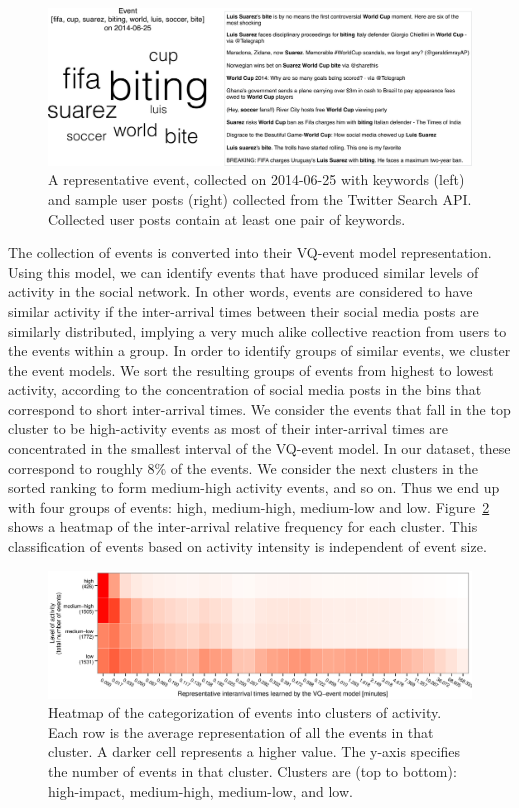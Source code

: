 \begin{figure}
  \includegraphics[width=\textwidth]{figures/high-activity/fig2}
  \caption[Example event]{A representative event, collected on 2014-06-25 with
      keywords (left) and sample user posts (right) collected from the Twitter
      Search API. Collected user posts contain at least one pair of keywords. }
  \label{fig:hi:components}
\end{figure}


The collection of events is converted into their VQ-event model representation. 
%
Using this model, we can identify events that have produced similar levels of
activity in the social network. 
%
In other words, events are considered to have similar activity if the
inter-arrival times between their social media posts are similarly distributed,
implying a very much alike collective reaction from users to the events within a
group. 
%
In order to identify groups of similar events, we cluster the event models. 
%
We sort the resulting groups of events from highest to lowest activity,
according to the concentration of social media posts in the bins that correspond
to short inter-arrival times. 
%
We consider the events that fall in the top cluster to be high-activity events
as most of their inter-arrival times are concentrated in the smallest interval of
the VQ-event model.
%
In our dataset, these correspond to roughly 8\% of the events. 
%
We consider the next clusters in the sorted ranking to form medium-high activity
events, and so on. 
%
Thus we end up with four groups of events: high, medium-high, medium-low and low.
Figure~\ref{fig:hi:heatmap} shows a heatmap of the inter-arrival relative
frequency for each cluster. 
%
This classification of events based on activity intensity is independent of
event size. 


\begin{figure}
  \includegraphics[width=\textwidth]{figures/high-activity/fig3}
  \caption[Heatmap of the categorization of events into clusters of
  activity.]{{Heatmap of the categorization of events into clusters of activity.
  Each row is the average representation of all the events in that cluster.  A
  darker cell represents a higher value. The y-axis specifies the number of
  events in that cluster. Clusters are (top to bottom): high-impact,
  medium-high, medium-low, and low.}}
  \label{fig:hi:heatmap}
\end{figure}